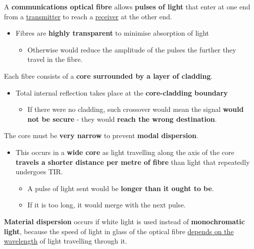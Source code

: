 A \textbf{communications optical fibre} allows \textbf{pulses of light} that enter at one end from a \underline{transmitter} to reach a \underline{receiver} at the other end.
\begin{itemize}
    \item Fibres are \textbf{highly transparent} to minimise absorption of light
        \begin{itemize}
            \item Otherwise would reduce the amplitude of the pulses the further they travel in the fibre.
        \end{itemize}
\end{itemize}

Each fibre consists of a \textbf{core surrounded by a layer of cladding}.
\begin{itemize}
    \item Total internal reflection takes place at the \textbf{core-cladding boundary}
        \begin{itemize}
            \item If there were no cladding, such crossover would mean the signal \textbf{would not be secure} - they would \textbf{reach the wrong destination}.
        \end{itemize}
\end{itemize}

The core must be \textbf{very narrow} to prevent \textbf{modal dispersion}.
\begin{itemize}
    \item This occurs in a \textbf{wide core} as light travelling along the axis of the core \textbf{travels a shorter distance per metre of fibre} than light that repeatedly undergoes TIR.
        \begin{itemize}
            \item A pulse of light sent would be \textbf{longer than it ought to be}.
            \item If it is too long, it would merge with the next pulse.
        \end{itemize}
\end{itemize}

\textbf{Material dispersion} occurs if white light is used instead of \textbf{monochromatic light}, because the speed of light in glass of the optical fibre \underline{depends on the wavelength} of light travelling through it.
